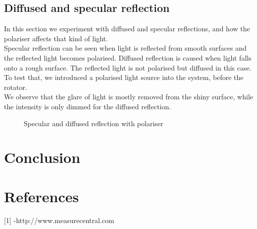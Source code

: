 \documentclass[english]{article}
\begin{document}
\subsection{Diffused and specular reflection}
In this section we experiment with diffused and specular reflections, and how the polariser affects that kind of light.\\
Specular reflection can be seen when light is reflected from smooth surfaces and the reflected light becomes polarised. Diffused reflection is caused when light falls onto a rough surface. The reflected light is not polarised but diffused in this case.\\
To test that, we introduced a polarised light source into the system, before the rotator. \\
We observe that the glare of light is mostly removed from the shiny surface, while the intensity is only dimmed for the diffused reflection.
\begin{figure}[H]
	\centering
	\caption{Specular and diffused reflection with polariser}
	\label{fig:one}
\end{figure}

\section{Conclusion}

\section{References}

{[}1{]} -http://www.measurecentral.com
\end{document}
